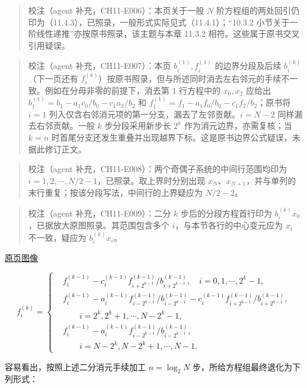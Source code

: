 \documentclass[
  10pt,
  fontset=fandol]{ctexart}
\begin{document}
\begin{quote}
校注（agent 补充，CH11-E006）：本页关于一般 \(N\) 阶方程组的两处回引仍印为（11.4.3），已照录，一般形式实际见式（11.4.1）；``10.3.2 小节关于一阶线性递推''亦按原书照录，该主题与本章 11.3.2 相符。这些属于原书交叉引用疑误。
\end{quote}

\begin{quote}
校注（agent 补充，CH11-E007）：本页 \(b_i^{(1)},f_i^{(1)}\) 的边界分段及后续 \(b_i^{(k)}\)（下一页还有 \(f_i^{(k)}\)）按原书照录，但与所述同时消去左右邻元的手续不一致。例如在分母非零的前提下，消去第 1 行方程中的 \(x_0,x_2\) 应给出 \(b_1^{(1)}=b_1-a_1c_0/b_0-c_1a_2/b_2\) 和 \(f_1^{(1)}=f_1-a_1f_0/b_0-c_1f_2/b_2\)；原书将 \(i=1\) 列入仅含右邻消元项的第一分支，漏去了左邻贡献。\(i=N-2\) 同样漏去右邻贡献。一般 \(k\) 步分段采用新步长 \(2^k\) 作为消元边界，亦需复核；当 \(k=n\) 时首尾分支还发生重叠并出现越界下标。这是原书边界公式疑误，未据此修订正文。
\end{quote}

\begin{quote}
校注（agent 补充，CH11-E008）：两个奇偶子系统的中间行范围均印为 \(i=1,2,\cdots,N/2-1\)，已照录。取上界时分别出现 \(x_N\)、\(x_{N+1}\)，并与单列的末行重复；按该分段写法，中间行的上界疑应为 \(N/2-2\)。
\end{quote}

\begin{quote}
校注（agent 补充，CH11-E009）：二分 \(k\) 步后的分段方程首行印为 \(b_i^{(k)}x_0\)，已据放大原图照录。其范围包含多个 \(i\)，与本节各行的中心变元应为 \(x_i\) 不一致，疑应为 \(b_i^{(k)}x_i\)。
\end{quote}

\href{../../source-images/pdf-292.jpeg}{原页图像}

\[
f_i^{(k)}=
\left\{
\begin{aligned}
&f_i^{(k-1)}-c_i^{(k-1)}f_{i+2^{k-1}}^{(k-1)}/b_{i+2^{k-1}}^{(k-1)},\quad i=0,1,\cdots,2^k-1,\\
&f_i^{(k-1)}-a_i^{(k-1)}f_{i-2^{k-1}}^{(k-1)}/b_{i-2^{k-1}}^{(k-1)}-c_i^{(k-1)}f_{i+2^{k-1}}^{(k-1)}/b_{i+2^{k-1}}^{(k-1)},\\
&\qquad i=2^k,2^k+1,\cdots,N-2^k-1,\\
&f_i^{(k-1)}-a_i^{(k-1)}f_{i-2^{k-1}}^{(k-1)}/b_{i-2^{k-1}}^{(k-1)},\\
&\qquad i=N-2^k,N-2^k+1,\cdots,N-1.
\end{aligned}
\right.
\]

容易看出，按照上述二分消元手续加工 \(n=\log_2 N\) 步，所给方程组最终退化为下列形式：
\end{document}
